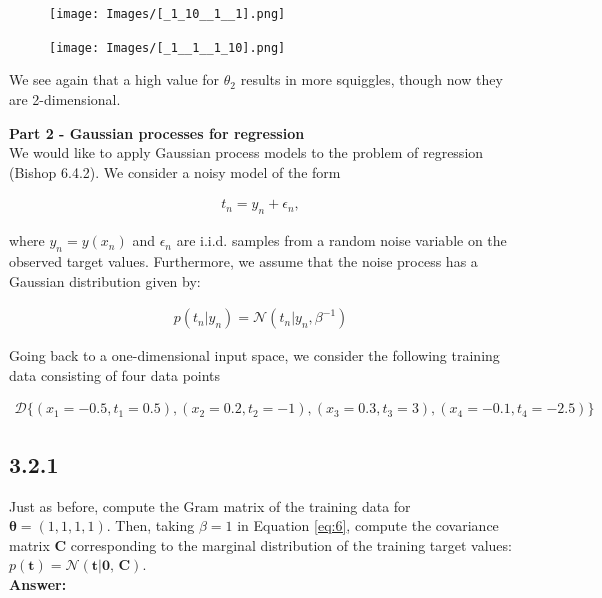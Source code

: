 \documentclass[a4paper]{article}
\begin{document}
\begin{figure}[H]
\texttt{[image: Images/[\_1\_10\_\_1\_\_1].png]}
\end{figure}

\begin{figure}[H]
\texttt{[image: Images/[\_1\_\_1\_\_1\_10].png]}
\end{figure}


We see again that a high value for $\theta_2$ results in more squiggles, though now they are 2-dimensional.


\textbf{Part 2 - Gaussian processes for regression}\\

We would like to apply Gaussian process models to the problem of regression (Bishop 6.4.2). We consider a noisy model of the form 

\begin{align*}
t_n = y_n + \epsilon_n,
\end{align*}

where $y_n = y(x_n)$ and $\epsilon_n$ are i.i.d. samples from a random noise variable on the observed target values. Furthermore, we assume that the noise process has a Gaussian distribution given by:

\begin{eqnarray}
p(t_n | y_n) = \mathcal{N}(t_n | y_n, \beta^{-1})
 \label{eq:6}
\end{eqnarray}

Going back to a one-dimensional input space, we consider the following training data consisting of four data points 

\begin{align*}
\mathcal{D} \{ (x_1 = -0.5, t_1 = 0.5), (x_2 = 0.2, t_2 = -1), (x_3 = 0.3, t_3 = 3),(x_4 = -0.1, t_4 = -2.5) \}
\end{align*}


\subsection*{3.2.1}

Just as before, compute the Gram matrix of the training data for $\boldsymbol{\theta} = (1,1,1,1)$. Then, taking $\beta = 1$ in Equation \ref{eq:6}, compute the covariance matrix \textbf{C} corresponding to the marginal distribution of the training target values: $p(\textbf{t}) = \mathcal{N}(\textbf{t} | \textbf{0, C})$.\\

\textbf{Answer:}\\
\end{document}
